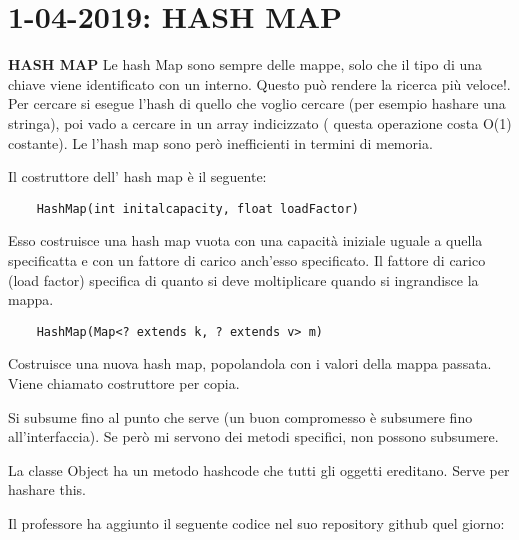 

\newpage
\section{1-04-2019: HASH MAP}
\textbf{HASH MAP} \newline
Le hash Map sono sempre delle mappe, solo che il tipo di una chiave viene identificato con un interno. Questo può rendere la ricerca più veloce!. \newline
Per cercare si esegue l'hash di quello che voglio cercare (per esempio hashare una stringa), poi vado a cercare in un array indicizzato ( questa operazione costa O(1) costante). \newline
Le l'hash map sono però inefficienti in termini di memoria. 

\noindent Il costruttore dell' hash map è il seguente: 
\begin{lstlisting}
	HashMap(int initalcapacity, float loadFactor)
\end{lstlisting}
Esso costruisce una hash map vuota con una capacità iniziale uguale a quella specificatta e con un fattore di carico anch'esso specificato. Il fattore di carico (load factor) specifica di quanto si deve moltiplicare quando si ingrandisce la mappa. 
\begin{lstlisting}
	HashMap(Map<? extends k, ? extends v> m)
\end{lstlisting}
Costruisce una nuova hash map, popolandola con i valori della mappa passata. Viene chiamato costruttore per copia.

\noindent Si subsume fino al punto che serve (un buon compromesso è subsumere fino all'interfaccia). Se però mi servono dei metodi specifici, non possono subsumere. 

\noindent La classe Object ha un metodo hashcode che tutti gli oggetti ereditano. Serve per hashare this.



\noindent Il professore ha aggiunto il seguente codice nel suo repository github quel giorno: 

